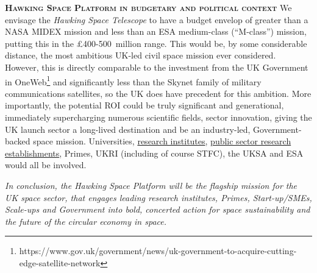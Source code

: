 \documentclass[a4paper,12pt]{texMemo}
\begin{document}

\smallskip \smallskip
\noindent
{\bfseries \textsc{\textcolor{Cerulean}{Hawking Space Platform in budgetary and political context}}}
  We envisage the \textit{Hawking Space Telescope} to have a budget envelop of
greater than a NASA MIDEX mission and less than an ESA medium-class
(``M-class'') mission, putting this in the \pounds400-500~million range.
This would be, by some considerable distance, the most ambitious UK-led
civil space mission ever considered. However, this is directly comparable to
the investment from the UK Government in
OneWeb\footnote{https://www.gov.uk/government/news/uk-government-to-acquire-cutting-edge-satellite-network}
and significantly less than the Skynet family of military
communications satellites, so the UK does have precedent for this
ambition.  More importantly, the potential ROI could be truly significant and generational,  
immediately supercharging numerous scientific fields, sector innovation, giving the
UK launch sector a long-lived destination and be an industry-led, 
Government-backed space mission.  Universities,
\href{https://www.ukri.org/apply-for-funding/how-to-apply/check-if-you-are-eligible-for-research-and-innovation-funding/eligible-research-institutes/}{research
institutes},
\href{https://www.ukri.org/apply-for-funding/how-to-apply/check-if-you-are-eligible-for-research-and-innovation-funding/eligible-public-sector-research-establishments/#contents-list}{public
sector research establishments}, Primes, UKRI (including of course STFC), the
UKSA and ESA would all be involved.

\smallskip \smallskip
\noindent
\textit{In conclusion, the \textit{Hawking Space Platform} will be the
flagship mission for the UK space sector, that engages leading
research institutes, Primes, Start-up/SMEs, Scale-ups and Government
into bold, concerted action for space sustainability and the future of
the circular economy in space.}
  \vspace{-18pt}

\end{document}

